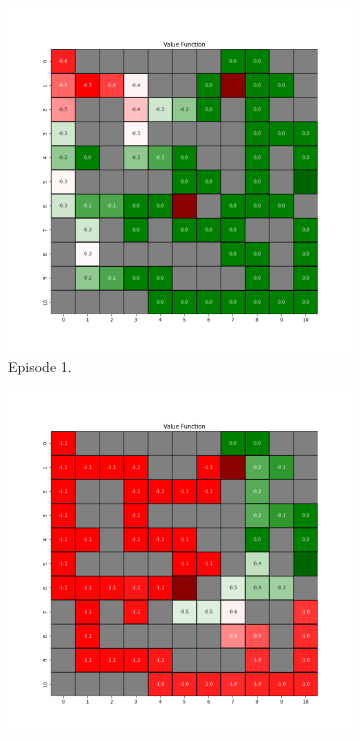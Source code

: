 \documentclass{assignment}
\begin{document}
\begin{figure}[H]
    \begin{subfigure}{0.3\textwidth}
        \includegraphics[width=\textwidth]{figures/value_q/gamma_sweep/value_function_alpha_0.1_gamma_0.1_epsilon_0.2_iteration_1.png}
    \caption{Episode 1.}
    \end{subfigure}\hfill
    \begin{subfigure}{0.3\textwidth}
        \includegraphics[width=\textwidth]{figures/value_q/gamma_sweep/value_function_alpha_0.1_gamma_0.1_epsilon_0.2_iteration_50.png}

\end{subfigure}
\end{figure}
\end{document}
